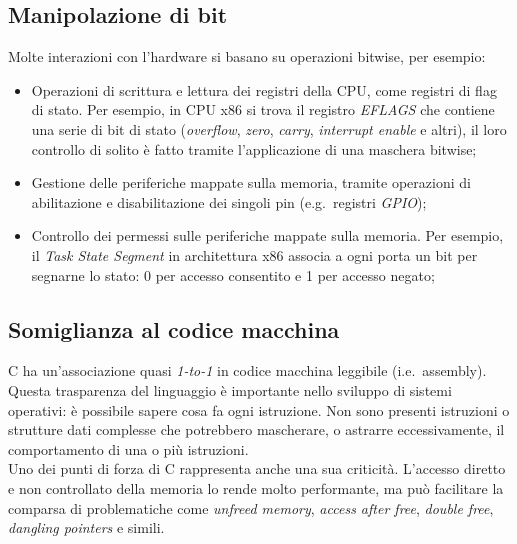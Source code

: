 \subsection*{Manipolazione di bit}
Molte interazioni con l'hardware si basano su operazioni bitwise, per esempio:
\begin{itemize}
    \item Operazioni di scrittura e lettura dei registri della CPU, come registri di flag di stato. Per esempio, in CPU x86 si trova il registro \textit{EFLAGS} che contiene una serie di bit di stato (\textit{overflow}, \textit{zero}, \textit{carry}, \textit{interrupt enable} e altri), il loro controllo di solito è fatto tramite l'applicazione di una maschera bitwise;
    \item Gestione delle periferiche mappate sulla memoria, tramite operazioni di abilitazione e disabilitazione dei singoli pin (e.g.\  registri \textit{GPIO});
    \item Controllo dei permessi sulle periferiche mappate sulla memoria. Per esempio, il \textit{Task State Segment} in architettura x86 associa a ogni porta un bit per segnarne lo stato: 0 per accesso consentito e 1 per accesso negato;
\end{itemize}

\subsection*{Somiglianza al codice macchina}
C ha un'associazione quasi \textit{1-to-1} in codice macchina leggibile (i.e.\  assembly). 
Questa trasparenza del linguaggio è importante nello sviluppo di 
sistemi operativi: è possibile sapere cosa fa ogni istruzione. Non sono 
presenti istruzioni o strutture dati complesse che potrebbero mascherare, o astrarre eccessivamente, 
il comportamento di una o più istruzioni.\hfill
\vspace{30pt}\\
\noindent Uno dei punti di forza di C rappresenta anche una sua criticità. 
L'accesso diretto e non controllato della memoria lo rende molto 
performante, ma può facilitare la comparsa di problematiche come 
\textit{unfreed memory}, \textit{access after free}, \textit{double free}, \textit{dangling pointers} e simili.


